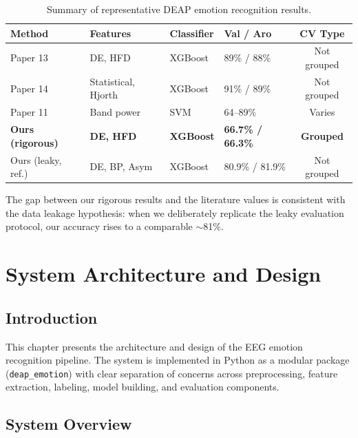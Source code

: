 \documentclass[12pt,a4paper]{report}
\begin{document}
\begin{table}[H]
\centering
\caption{Summary of representative DEAP emotion recognition results.}
\label{tab:sota}
\begin{tabular}{p{3.5cm}lllc}
\toprule
\textbf{Method} & \textbf{Features} & \textbf{Classifier} & \textbf{Val / Aro} & \textbf{CV Type} \\
\midrule
Paper 13 & DE, HFD & XGBoost & 89\% / 88\% & Not grouped \\
Paper 14 & Statistical, Hjorth & XGBoost & 91\% / 89\% & Not grouped \\
Paper 11 & Band power & SVM & 64--89\% & Varies \\
\midrule
\textbf{Ours (rigorous)} & \textbf{DE, HFD} & \textbf{XGBoost} & \textbf{66.7\% / 66.3\%} & \textbf{Grouped} \\
Ours (leaky, ref.) & DE, BP, Asym & XGBoost & 80.9\% / 81.9\% & Not grouped \\
\bottomrule
\end{tabular}
\end{table}

The gap between our rigorous results and the literature values is consistent
with the data leakage hypothesis: when we deliberately replicate the leaky
evaluation protocol, our accuracy rises to a comparable $\sim$81\%.


\chapter{System Architecture and Design}
\label{ch:architecture}

\section{Introduction}

This chapter presents the architecture and design of the EEG emotion
recognition pipeline. The system is implemented in Python as a modular package
(\texttt{deap\_emotion}) with clear separation of concerns across preprocessing,
feature extraction, labeling, model building, and evaluation components.

\section{System Overview}
\end{document}
